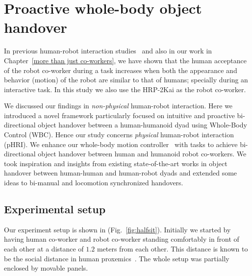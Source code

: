 	
{\color{blue}\chapter{Proactive whole-body object handover}\label{handover chapter}}


In previous human-robot interaction studies~\cite{huber2008human, strabala2013toward, shibata1995experimental} and also in our work in Chapter~\ref{more than just co-workers}, we have shown that the human acceptance of the robot co-worker during a task increases when both the appearance and behavior (motion) of the robot are similar to that of humans; specially during an interactive task. In this study we also use the HRP-2Kai as the robot co-worker.

We discussed our findings in \textit{non-physical} human-robot interaction. Here we introduced a novel framework particularly focused on intuitive and proactive bi-directional object handover between a human-humanoid dyad using Whole-Body Control (WBC). Hence our study concerns \textit{physical} human-robot interaction (pHRI). We enhance our whole-body motion controller~\cite{bouyarmane2018quadratic} with tasks to achieve bi-directional object handover between human and humanoid robot co-workers. We took inspiration and insights from existing state-of-the-art works in object handover between human-human and human-robot dyads and extended some ideas to bi-manual and locomotion synchronized handovers.



\section{Experimental setup}

Our experiment setup is shown in (Fig.~\ref{fig:halfsit}). Initially we started by having human co-worker and robot co-worker standing comfortably in front of each other at a distance of $1.2$ meters from each other. This distance is known to be the social distance in human proxemics~\cite{hall1966proxemic}. The whole setup was partially enclosed by movable panels.

